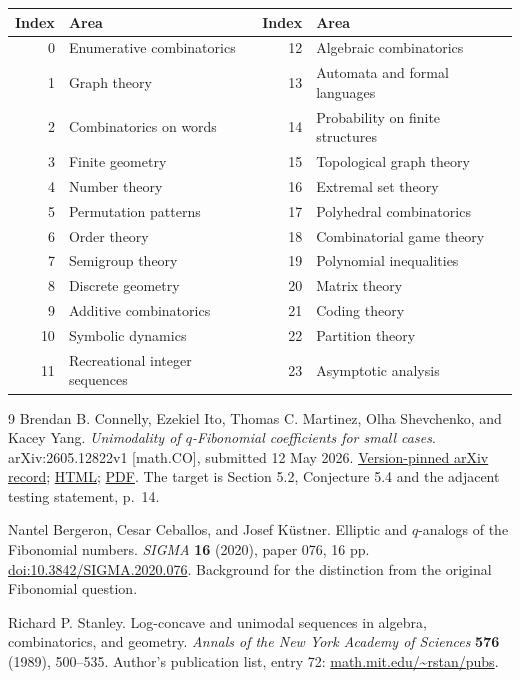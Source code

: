\documentclass[11pt]{article}
\theoremstyle{research}
\theoremstyle{definition}
\numberwithin{equation}{section}
\begin{document}
\begin{center}
\small
\begin{tabular}{r l r l}
\toprule
Index&Area&Index&Area\\
\midrule
0&Enumerative combinatorics&12&Algebraic combinatorics\\
1&Graph theory&13&Automata and formal languages\\
2&Combinatorics on words&14&Probability on finite structures\\
3&Finite geometry&15&Topological graph theory\\
4&Number theory&16&Extremal set theory\\
5&Permutation patterns&17&Polyhedral combinatorics\\
6&Order theory&18&Combinatorial game theory\\
7&Semigroup theory&19&Polynomial inequalities\\
8&Discrete geometry&20&Matrix theory\\
9&Additive combinatorics&21&Coding theory\\
10&Symbolic dynamics&22&Partition theory\\
11&Recreational integer sequences&23&Asymptotic analysis\\
\bottomrule
\end{tabular}
\end{center}

\begin{thebibliography}{9}
Brendan B. Connelly, Ezekiel Ito, Thomas C. Martinez,
Olha Shevchenko, and Kacey Yang.
\newblock \emph{Unimodality of $q$-Fibonomial coefficients for small cases}.
\newblock arXiv:2605.12822v1 [math.CO], submitted 12 May 2026.
\newblock \href{https://arxiv.org/abs/2605.12822v1}{Version-pinned arXiv record};
\href{https://arxiv.org/html/2605.12822v1}{HTML};
\href{https://arxiv.org/pdf/2605.12822v1}{PDF}.
\newblock The target is Section 5.2, Conjecture 5.4 and the adjacent testing
statement, p.~14.

Nantel Bergeron, Cesar Ceballos, and Josef K\"ustner.
\newblock Elliptic and $q$-analogs of the Fibonomial numbers.
\newblock \emph{SIGMA} \textbf{16} (2020), paper 076, 16 pp.
\newblock \href{https://doi.org/10.3842/SIGMA.2020.076}{doi:10.3842/SIGMA.2020.076}.
\newblock Background for the distinction from the original Fibonomial question.

Richard P. Stanley.
\newblock Log-concave and unimodal sequences in algebra, combinatorics,
and geometry.
\newblock \emph{Annals of the New York Academy of Sciences}
\textbf{576} (1989), 500--535.
\newblock Author's publication list, entry 72:
\href{https://math.mit.edu/~rstan/pubs/}{math.mit.edu/\textasciitilde rstan/pubs}.
\end{thebibliography}
\end{document}
